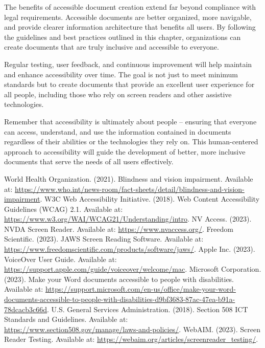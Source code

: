 The benefits of accessible document creation extend far beyond compliance with legal requirements. Accessible documents are better organized, more navigable, and provide clearer information architecture that benefits all users. By following the guidelines and best practices outlined in this chapter, organizations can create documents that are truly inclusive and accessible to everyone.

Regular testing, user feedback, and continuous improvement will help maintain and enhance accessibility over time. The goal is not just to meet minimum standards but to create documents that provide an excellent user experience for all people, including those who rely on screen readers and other assistive technologies.

Remember that accessibility is ultimately about people – ensuring that everyone can access, understand, and use the information contained in documents regardless of their abilities or the technologies they rely on. This human-centered approach to accessibility will guide the development of better, more inclusive documents that serve the needs of all users effectively.

\begin{thebibliography}{99}
 World Health Organization. (2021). Blindness and vision impairment. Available at: \url{https://www.who.int/news-room/fact-sheets/detail/blindness-and-vision-impairment}.
 W3C Web Accessibility Initiative. (2018). Web Content Accessibility Guidelines (WCAG) 2.1. Available at: \url{https://www.w3.org/WAI/WCAG21/Understanding/intro}.
 NV Access. (2023). NVDA Screen Reader. Available at: \url{https://www.nvaccess.org/}.
 Freedom Scientific. (2023). JAWS Screen Reading Software. Available at: \url{https://www.freedomscientific.com/products/software/jaws/}.
 Apple Inc. (2023). VoiceOver User Guide. Available at: \url{https://support.apple.com/guide/voiceover/welcome/mac}.
 Microsoft Corporation. (2023). Make your Word documents accessible to people with disabilities. Available at: \url{https://support.microsoft.com/en-us/office/make-your-word-documents-accessible-to-people-with-disabilities-d9bf3683-87ac-47ea-b91a-78dcacb3c66d}.
 U.S. General Services Administration. (2018). Section 508 ICT Standards and Guidelines. Available at: \url{https://www.section508.gov/manage/laws-and-policies/}.
 WebAIM. (2023). Screen Reader Testing. Available at: \url{https://webaim.org/articles/screenreader_testing/}.
\end{thebibliography}
